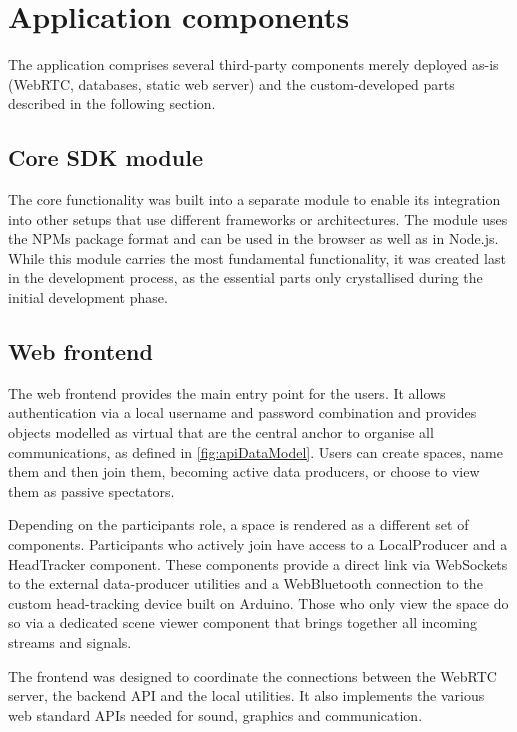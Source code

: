 \section{Application components}
\label{sec:application-components}

The application comprises several third-party components merely deployed as-is (WebRTC, databases, static web server) and the custom-developed parts described in the following section.

\subsection{Core SDK module}

The core functionality was built into a separate module to enable its integration into other setups that use different frameworks or architectures.
The module uses the \ac{NPM}\textquotesingle s package format and can be used in the browser as well as in Node.js.
While this module carries the most fundamental functionality, it was created last in the development process, as the essential parts only crystallised during the initial development phase.

\subsection{Web frontend}

The web frontend provides the main entry point for the users.
It allows authentication via a local username and password combination and provides objects modelled as virtual  that are the central anchor to organise all communications, as defined in \autoref{fig:apiDataModel}.
Users can create spaces, name them and then join them, becoming active data producers, or choose to view them as passive spectators.

Depending on the participant\textquotesingle s role, a space is rendered as a different set of components.
Participants who actively join have access to a LocalProducer and a HeadTracker component.
These components provide a direct link via WebSockets to the external data-producer utilities and a WebBluetooth connection to the custom head-tracking device built on Arduino.
Those who only view the space do so via a dedicated scene viewer component that brings together all incoming streams and signals.

The frontend was designed to coordinate the connections between the WebRTC server, the backend \ac{API} and the local utilities.
It also implements the various web standard \ac{API}s needed for sound, graphics and communication.

